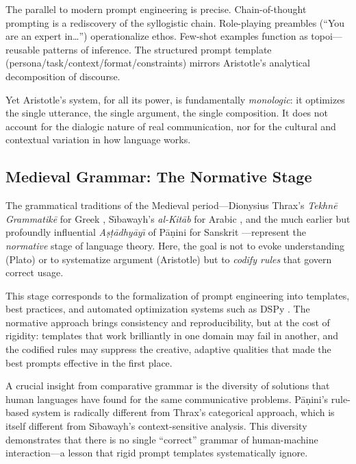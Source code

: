 \documentclass[11pt,a4paper]{article}
\begin{document}
The parallel to modern prompt engineering is precise. Chain-of-thought prompting \citep{wei2022chain} is a rediscovery of the syllogistic chain. Role-playing preambles (``You are an expert in\ldots'') operationalize ethos. Few-shot examples function as topoi---reusable patterns of inference. The structured prompt template (persona/task/context/format/constraints) mirrors Aristotle's analytical decomposition of discourse.

Yet Aristotle's system, for all its power, is fundamentally \emph{monologic}: it optimizes the single utterance, the single argument, the single composition. It does not account for the dialogic nature of real communication, nor for the cultural and contextual variation in how language works.

\subsection{Medieval Grammar: The Normative Stage}

The grammatical traditions of the Medieval period---Dionysius Thrax's \emph{Tekhn\=e Grammatik\=e} for Greek \citep{thrax_grammar}, S\={\i}bawayh's \emph{al-Kit\=ab} for Arabic \citep{sibawayh_alkitab}, and the much earlier but profoundly influential \emph{A\d{s}\d{t}\=adhy\=ay\={\i}} of P\=a\d{n}ini for Sanskrit \citep{panini_astadhyayi}---represent the \emph{normative} stage of language theory. Here, the goal is not to evoke understanding (Plato) or to systematize argument (Aristotle) but to \emph{codify rules} that govern correct usage.

This stage corresponds to the formalization of prompt engineering into templates, best practices, and automated optimization systems such as DSPy \citep{khattab2023dspy}. The normative approach brings consistency and reproducibility, but at the cost of rigidity: templates that work brilliantly in one domain may fail in another, and the codified rules may suppress the creative, adaptive qualities that made the best prompts effective in the first place.

A crucial insight from comparative grammar is the diversity of solutions that human languages have found for the same communicative problems. P\=a\d{n}ini's rule-based system is radically different from Thrax's categorical approach, which is itself different from S\={\i}bawayh's context-sensitive analysis. This diversity demonstrates that there is no single ``correct'' grammar of human-machine interaction---a lesson that rigid prompt templates systematically ignore.
\end{document}
